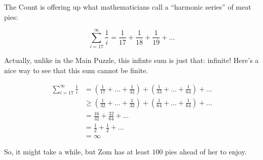 


The Count is offering up what mathematicians call a
``harmonic series'' of meat pies:

\[
  \sum_{i=17}^\infty \frac{1}{i}
=
  \frac{1}{17}+\frac{1}{18}+\frac{1}{19}+\dots
\]

Actually, unlike in the Main Puzzle,
this infinte sum is just that: infinite! Here's a nice way to see that
this sum cannot be finite.

\[
  \begin{array}{rl}
  \sum_{i=17}^\infty \frac{1}{i} &
  =
  (\frac{1}{17}+\dots+\frac{1}{32})+(\frac{1}{33}+\dots+\frac{1}{64})+\dots
  \\ &
  \geq
  (\frac{1}{32}+\dots+\frac{1}{32})+(\frac{1}{64}+\dots+\frac{1}{64})+\dots
  \\ &
  =
  \frac{16}{32}+\frac{32}{64}+\dots
  \\ &
  =
  \frac{1}{2}+\frac{1}{2}+\dots
  \\ &
  =
  \infty
\end{array}
\]

So, it might take a while, but Zom has at least \(100\) pies ahead of her
to enjoy.
